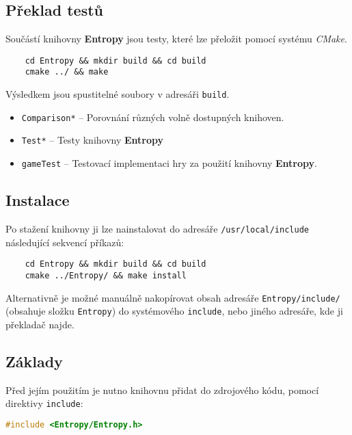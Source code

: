 \subsection*{Překlad testů}

Součástí knihovny \textbf{Entropy} jsou testy, které lze přeložit pomocí systému \emph{CMake}.

\begin{lstlisting}
	cd Entropy && mkdir build && cd build
	cmake ../ && make
\end{lstlisting}

\noindent Výsledkem jsou spustitelné soubory v adresáři \texttt{build}.
\begin{itemize}
	\item \texttt{Comparison*} -- Porovnání různých volně dostupných knihoven.
	\item \texttt{Test*} -- Testy knihovny \textbf{Entropy}
	\item \texttt{gameTest} -- Testovací implementaci hry za použití knihovny \textbf{Entropy}.
\end{itemize}

\subsection*{Instalace}

Po stažení knihovny ji lze nainstalovat do adresáře \texttt{/usr/local/include} následující sekvencí příkazů: 

\begin{lstlisting}
	cd Entropy && mkdir build && cd build
	cmake ../Entropy/ && make install
\end{lstlisting}

\noindent Alternativně je možné manuálně nakopírovat obsah adresáře \texttt{Entropy/include/} (obsahuje složku \texttt{Entropy}) do systémového \texttt{include}, nebo jiného adresáře, kde ji překladač najde.

\subsection*{Základy}

Před jejím použitím je nutno knihovnu přidat do zdrojového kódu, pomocí direktivy \texttt{include}:

\begin{lstlisting}[backgroundcolor = \color{lightgray}, language = C++, xleftmargin = 2cm, framexleftmargin = 1em, tabsize=4]
#include <Entropy/Entropy.h>
\end{lstlisting}

